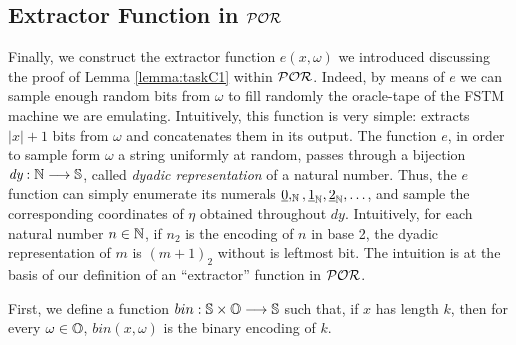 \subsection{Extractor Function in $\mathcal{POR}$}\label{sec:E}
Finally, we construct the extractor function $e(x, \omega)$
we introduced discussing the proof of Lemma \ref{lemma:taskC1} within $\mathcal{POR}$.
%
Indeed, by means of $e$ we can sample enough random bits from $\omega$ to fill
randomly the oracle-tape of the FSTM machine we are emulating.
%
Intuitively, this function is very simple: extracts $|x|+1$ bits from $\omega$
and concatenates them in its output.
%
The function $e$, in order to sample form $\omega$ a string uniformly at random,
passes through a bijection $\emph{dy}: \mathbb{N} \longrightarrow \mathbb{S}$, called \emph{dyadic
representation} of a natural number. Thus, the $e$ function can simply enumerate
its numerals $\underline 0,_{\mathbb{N}}, \underline 1_{\mathbb{N}},\underline 2_{\mathbb{N}}, \ldots$, and sample
the corresponding coordinates of $\eta$ obtained throughout $\mathit{dy}$.
Intuitively, for each natural number $n\in \mathbb{N}$,
if $n_2$ is the encoding of $n$ in base 2,
the dyadic representation of $m$ is $(m+1)_2$ without is leftmost bit.
%
%
The intuition is at the basis of our definition
of an ``extractor'' function in $\mathcal{POR}$.




%
%











First, we define a function $bin:\mathbb{S}\times \mathbb{O}\longrightarrow \mathbb{S}$
such that, if $x$ has length $k$,
then for every $\omega\in \mathbb{O}$,
$bin(x,\omega)$ is the binary encoding of $k$.





